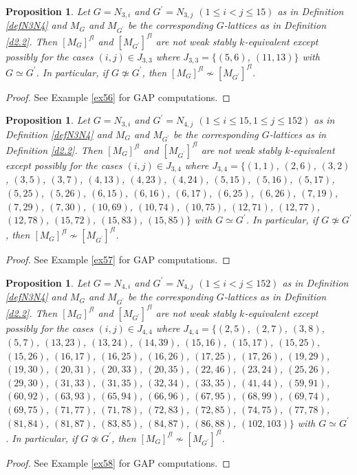 \documentclass{amsart}
\theoremstyle{plain}
\newtheorem{proposition}[theorem]{Proposition}
\theoremstyle{definition}
\theoremstyle{remark}
\begin{document}
\begin{proposition}\label{prop5.2}
Let $G=N_{3,i}$ and $G^\prime=N_{3,j}$ $(1\leq i<j\leq 15)$ 
as in Definition \ref{defN3N4} 
and $M_G$ and $M_{G^\prime}$ 
be the corresponding $G$-lattices as in Definition \ref{d2.2}. 
Then $[M_G]^{fl}$ and $[M_{G^\prime}]^{fl}$ 
are not weak stably $k$-equivalent 
except possibly for the cases $(i,j)\in J_{3,3}$ where 
$J_{3,3}=\{(5,6)$, $(11,13)\}$ with $G\simeq G^\prime$. 
In particular, if $G\not\simeq G^\prime$, 
then $[M_G]^{fl}\not\sim [M_{G^\prime}]^{fl}$. 
\end{proposition}
%
\begin{proof}
See Example \ref{ex56} for GAP computations. 
\end{proof}

\begin{proposition}\label{prop5.3}
Let $G=N_{3,i}$ and $G^\prime=N_{4,j}$ $(1\leq i\leq 15, 1\leq j\leq 152)$ 
as in Definition \ref{defN3N4} 
and $M_G$ and $M_{G^\prime}$ 
be the corresponding $G$-lattices as in Definition \ref{d2.2}. 
Then $[M_G]^{fl}$ and $[M_{G^\prime}]^{fl}$ 
are not weak stably $k$-equivalent 
except possibly for the cases $(i,j)\in J_{3,4}$ where 
$J_{3,4}=\{(1,1)$, $(2,6)$, $(3,2)$, $(3,5)$, $(3,7)$, $(4,13)$,
$(4,23)$, $(4,24)$, $(5,15)$, $(5,16)$, $(5,17)$, $(5,25)$, $(5,26)$,
$(6,15)$, $(6,16)$, $(6,17)$, $(6,25)$, $(6,26)$, $(7,19)$, $(7,29)$,
$(7,30)$, $(10,69)$, $(10,74)$, $(10,75)$, $(12,71)$, $(12,77)$,
$(12,78)$, $(15,72)$, $(15,83)$, $(15,85)\}$ with $G\simeq G^\prime$. 
In particular, if $G\not\simeq G^\prime$, 
then $[M_G]^{fl}\not\sim [M_{G^\prime}]^{fl}$. 
\end{proposition}
%
\begin{proof}
See Example \ref{ex57} for GAP computations. 
\end{proof}

\begin{proposition}\label{prop5.4}
Let $G=N_{4,i}$ and $G^\prime=N_{4,j}$ $(1\leq i<j\leq 152)$ 
as in Definition \ref{defN3N4} 
and $M_G$ and $M_{G^\prime}$ 
be the corresponding $G$-lattices as in Definition \ref{d2.2}.  
Then $[M_G]^{fl}$ and $[M_{G^\prime}]^{fl}$ 
are not weak stably $k$-equivalent 
except possibly for the cases $(i,j)\in J_{4,4}$ where 
$J_{4,4}=\{(2,5)$, $(2,7)$, $(3,8)$, $(5,7)$, $(13,23)$, 
$(13,24)$, $(14,39)$, $(15,16)$, $(15,17)$, 
$(15,25)$, $(15,26)$, $(16,17)$, $(16,25)$, 
$(16,26)$, $(17,25)$, $(17,26)$, $(19,29)$, 
$(19,30)$, $(20,31)$, $(20,33)$, $(20,35)$, 
$(22,46)$, $(23,24)$, $(25,26)$, $(29,30)$, 
$(31,33)$, $(31,35)$, $(32,34)$, $(33,35)$, 
$(41,44)$, $(59,91)$, $(60,92)$, $(63,93)$, 
$(65,94)$, $(66,96)$, $(67,95)$, $(68,99)$, 
$(69,74)$, $(69,75)$, $(71,77)$, $(71,78)$, 
$(72,83)$, $(72,85)$, $(74,75)$, $(77,78)$, 
$(81,84)$, $(81,87)$, $(83,85)$, 
$(84,87)$, $(86,88)$, $(102,103)\}$ 
with $G\simeq G^\prime$. 
In particular, if $G\not\simeq G^\prime$, 
then $[M_G]^{fl}\not\sim [M_{G^\prime}]^{fl}$. 
\end{proposition}
%
\begin{proof}
See Example \ref{ex58} for GAP computations. 
\end{proof}
\end{document}
